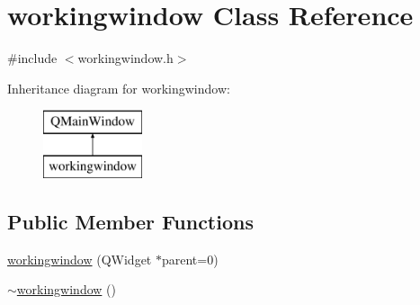 \hypertarget{classworkingwindow}{\section{workingwindow Class Reference}
\label{classworkingwindow}
}


{\ttfamily \#include $<$workingwindow.\-h$>$}

Inheritance diagram for workingwindow\-:\begin{figure}[H]
\begin{center}
\leavevmode
\includegraphics[height=2.000000cm]{classworkingwindow}
\end{center}
\end{figure}
\subsection*{Public Member Functions}
\begin{DoxyCompactItemize}
\item 
\hyperlink{classworkingwindow_a25b4ff6fe8b8cce836be4a4704132a68}{workingwindow} (Q\-Widget $\ast$parent=0)
\item 
\hyperlink{classworkingwindow_a0da6e75e764e958f1267c47dc4edf53c}{$\sim$workingwindow} ()
\end{DoxyCompactItemize}
